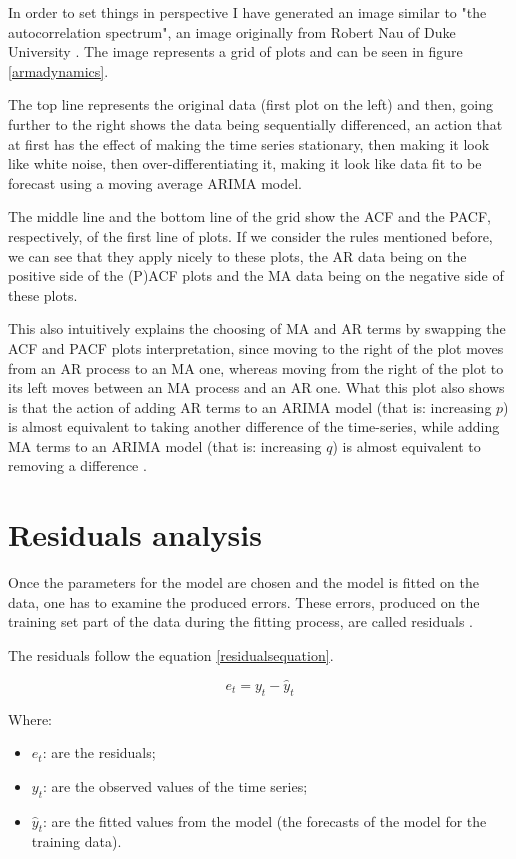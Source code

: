 \documentclass[12pt,a4paper,titlepage]{report}
\begin{document}
In order to set things in perspective I have generated an image similar to "the autocorrelation spectrum", an image originally from Robert Nau of Duke University \cite{nauspectrum}. The image represents a grid of plots and can be seen in figure \ref{armadynamics}.

The top line represents the original data (first plot on the left) and then, going further to the right shows the data being sequentially differenced, an action that at first has the effect of making the time series stationary, then making it look like white noise, then over-differentiating it, making it look like data fit to be forecast using a moving average ARIMA model.

The middle line and the bottom line of the grid show the ACF and the PACF, respectively, of the first line of plots. If we consider the rules mentioned before, we can see that they apply nicely to these plots, the AR data being on the positive side of the (P)ACF plots and the MA data being on the negative side of these plots.

This also intuitively explains the choosing of MA and AR terms by swapping the ACF and PACF plots interpretation, since moving to the right of the plot moves from an AR process to an MA one, whereas moving from the right of the plot to its left moves between an MA process and an AR one. What this plot also shows is that the action of adding AR terms to an ARIMA model (that is: increasing $ p $) is almost equivalent to taking another difference of the time-series, while adding MA terms to an ARIMA model (that is: increasing $ q $) is almost equivalent to removing a difference \cite{nauarimaarmarules}.

\section{Residuals analysis}

Once the parameters for the model are chosen and the model is fitted on the data, one has to examine the produced errors. These errors, produced on the training set part of the data during the fitting process, are called residuals \cite{boxjenkins}.

The residuals follow the equation \ref{residualsequation}.

\begin{equation}
e_{t} = y_{t}-\hat{y}_{t}
\label{residualsequation}
\end{equation}

Where:
\begin{itemize}
    \item $ e_{t}$: are the residuals;
    \item $ y_{t}$: are the observed values of the time series;
    \item $ \hat{y}_{t}$: are the fitted values from the model (the forecasts of the model for the training data).
\end{itemize}
\end{document}
